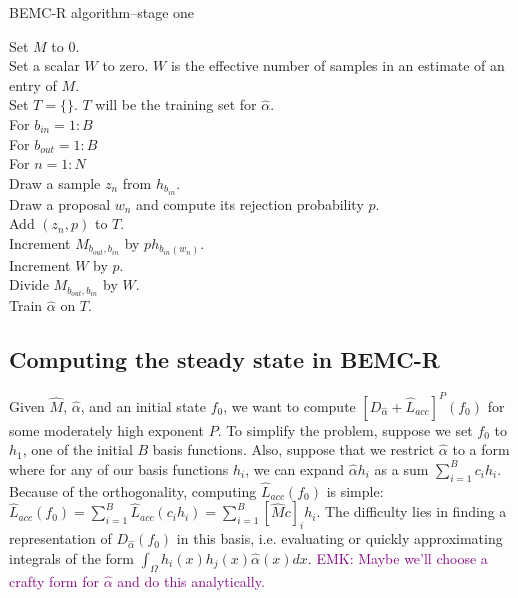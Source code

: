 \documentclass{article}
\newcommand\EMK[1]{\textcolor{purple}{EMK: #1}}
\begin{document}
\begin{algorithm}[h]
\caption{BEMC-R algorithm--stage one}
Set $M$ to $0$.\\ 
Set a scalar $W$ to zero. $W$ is the effective number of samples in an estimate of an entry of $M$.\\
Set $T = \{\}$. $T$ will be the training set for $\hat{\alpha}$.\\
For $b_{in}  = 1:B$\\
\Indp
For $b_{out}  = 1:B$\\
\Indp
For $n = 1:N$\\
\Indp
Draw a sample $z_n$ from $h_{b_{in}}$.\\
Draw a proposal $w_n$ and compute its rejection probability $p$.\\
Add $(z_n, p)$ to $T$.\\
Increment $M_{b_{out}, b_{in}}$ by $ph_{b_{in}(w_n)}$.\\
Increment $W$ by $p$.\\
\Indm
Divide $M_{b_{out}, b_{in}}$ by $W$.\\
\Indm
\Indm
Train $\hat{\alpha}$ on $T$.\\
\end{algorithm}



\subsection{Computing the steady state in BEMC-R}
 Given $\hat{M}$, $\hat{\alpha}$, and an initial state $f_0$, we want to compute $[D_{\hat{\alpha}}+\hat{L}_{acc}]^P(f_0)$ for some moderately high exponent $P$. To simplify the problem, suppose we set $f_0$ to $h_1$, one of the initial $B$ basis functions. Also, suppose that we restrict $\hat{\alpha}$ to a form where for any of our basis functions $h_i$, we can expand $\hat{\alpha}h_i$ as a sum $\sum_{i=1}^B c_i h_i$. Because of the orthogonality, computing $\hat{L}_{acc}(f_0)$ is simple: $\hat{L}_{acc}(f_0) = \sum_{i=1}^B \hat{L}_{acc}(c_i h_i) = \sum_{i=1}^B [\hat{M}c]_i h_i$. The difficulty lies in finding a representation of $D_{\hat{\alpha}}(f_0)$ in this basis, i.e. evaluating or quickly approximating integrals of the form $\int_{\Omega} h_i(x)h_j(x)\hat{\alpha}(x)dx$. \EMK{Maybe we'll choose a crafty form for $\hat{\alpha}$ and do this analytically. }
\end{document}
